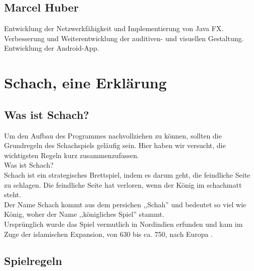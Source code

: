 \documentclass[12pt,a4paper]{article}
\begin{document}
 \subsection{Marcel Huber}
	Entwicklung der Netzwerkfähigkeit und Implementierung von Java FX.
Verbesserung und Weiterentwicklung der auditiven- und visuellen Gestaltung.
Entwicklung der Android-App.


\clearpage\vfill\newpage{}

\section{Schach, eine Erklärung}
\label{SEC:CHESS}

\subsection{Was ist Schach?}
\label{SUBSEC:CHESS-EXPLAIN}
Um den Aufbau des Programmes nachvollziehen zu können, sollten die Grundregeln des Schachspiels geläufig sein. Hier haben wir versucht, die wichtigsten Regeln kurz zusammenzufassen. \\
Was ist Schach? \\
Schach ist ein strategisches Brettspiel, indem es darum geht, die feindliche Seite zu schlagen. Die feindliche Seite hat verloren, wenn der König im schachmatt steht. \\
Der Name Schach kommt aus dem persichen ,,Schah'' und bedeutet so viel wie König, woher der Name ,,königliches Spiel'' stammt. \\
Ursprünglich wurde das Spiel vermutlich in Nordindien erfunden und kam im Zuge der islamischen Expansion, von 630 bis ca. 750, nach Europa \cite{wiki:chess}.


\subsection{Spielregeln}
\label{SUBSEC:GAMERULES}
\end{document}
